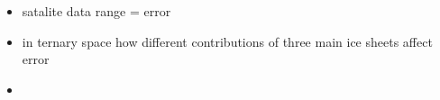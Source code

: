 \begin{itemize}
  \item satalite data range = error
  \item in ternary space how different contributions of three main ice sheets affect error
  \item
\end{itemize}

